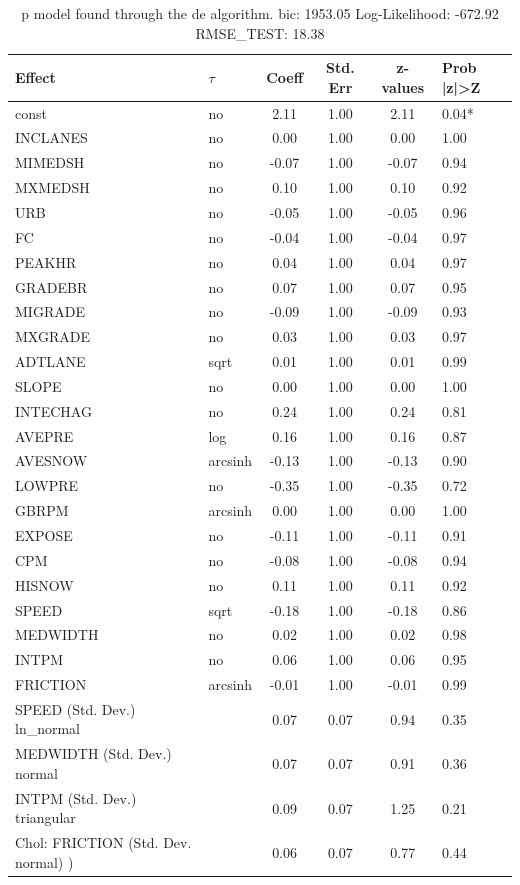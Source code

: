 \begin{table}
	\caption{p model found through the de algorithm. bic: 1953.05 Log-Likelihood: -672.92 RMSE_TEST: 18.38}
	\begin{center}
		\begin{tabular}{|l|l|c|c|c|l|}
			\hline
			Effect & $\tau$ & Coeff & Std. Err & z-values & Prob |z|>Z \\
			\hline
			const & no & 2.11 & 1.00 & 2.11 & 0.04* \\
			\hline
			INCLANES & no & 0.00 & 1.00 & 0.00 & 1.00 \\
			\hline
			MIMEDSH & no & -0.07 & 1.00 & -0.07 & 0.94 \\
			\hline
			MXMEDSH & no & 0.10 & 1.00 & 0.10 & 0.92 \\
			\hline
			URB & no & -0.05 & 1.00 & -0.05 & 0.96 \\
			\hline
			FC & no & -0.04 & 1.00 & -0.04 & 0.97 \\
			\hline
			PEAKHR & no & 0.04 & 1.00 & 0.04 & 0.97 \\
			\hline
			GRADEBR & no & 0.07 & 1.00 & 0.07 & 0.95 \\
			\hline
			MIGRADE & no & -0.09 & 1.00 & -0.09 & 0.93 \\
			\hline
			MXGRADE & no & 0.03 & 1.00 & 0.03 & 0.97 \\
			\hline
			ADTLANE & sqrt & 0.01 & 1.00 & 0.01 & 0.99 \\
			\hline
			SLOPE & no & 0.00 & 1.00 & 0.00 & 1.00 \\
			\hline
			INTECHAG & no & 0.24 & 1.00 & 0.24 & 0.81 \\
			\hline
			AVEPRE & log & 0.16 & 1.00 & 0.16 & 0.87 \\
			\hline
			AVESNOW & arcsinh & -0.13 & 1.00 & -0.13 & 0.90 \\
			\hline
			LOWPRE & no & -0.35 & 1.00 & -0.35 & 0.72 \\
			\hline
			GBRPM & arcsinh & 0.00 & 1.00 & 0.00 & 1.00 \\
			\hline
			EXPOSE & no & -0.11 & 1.00 & -0.11 & 0.91 \\
			\hline
			CPM & no & -0.08 & 1.00 & -0.08 & 0.94 \\
			\hline
			HISNOW & no & 0.11 & 1.00 & 0.11 & 0.92 \\
			\hline
			SPEED & sqrt & -0.18 & 1.00 & -0.18 & 0.86 \\
			\hline
			MEDWIDTH & no & 0.02 & 1.00 & 0.02 & 0.98 \\
			\hline
			INTPM & no & 0.06 & 1.00 & 0.06 & 0.95 \\
			\hline
			FRICTION & arcsinh & -0.01 & 1.00 & -0.01 & 0.99 \\
			\hline
			SPEED (Std. Dev.) ln_normal &  & 0.07 & 0.07 & 0.94 & 0.35 \\
			\hline
			MEDWIDTH (Std. Dev.) normal &  & 0.07 & 0.07 & 0.91 & 0.36 \\
			\hline
			INTPM (Std. Dev.) triangular &  & 0.09 & 0.07 & 1.25 & 0.21 \\
			\hline
			 Chol: FRICTION (Std. Dev. normal) ) &  & 0.06 & 0.07 & 0.77 & 0.44 \\
			\hline
		\end{tabular}
	\end{center}
\end{table}
